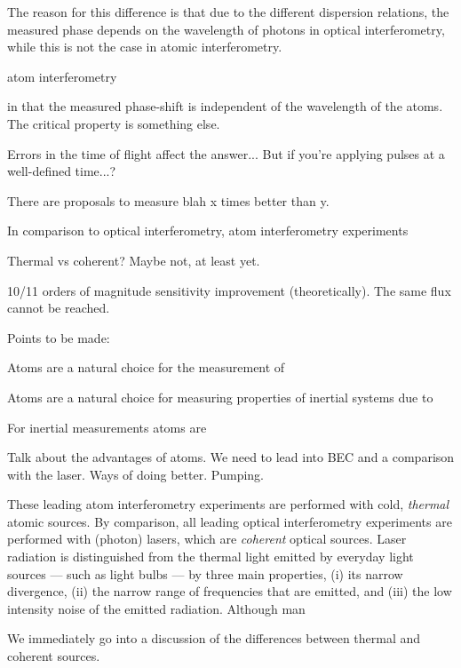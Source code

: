 The reason for this difference is that due to the different dispersion relations, the measured phase depends on the wavelength of photons in optical interferometry, while this is not the case in atomic interferometry.  

atom interferometry 

in that the measured phase-shift is independent of the wavelength of the atoms.  The critical property is something else.  

Errors in the time of flight affect the answer... But if you're applying pulses at a well-defined time...?


There are proposals to measure blah x times better than y.



In comparison to optical interferometry, atom interferometry experiments 

Thermal vs coherent?  Maybe not, at least yet.


10/11 orders of magnitude sensitivity improvement (theoretically).  The same flux cannot be reached.  

Points to be made:



Atoms are a natural choice for the measurement of 

Atoms are a natural choice for measuring properties of inertial systems due to


For inertial measurements atoms are 


Talk about the advantages of atoms.  We need to lead into BEC and a comparison with the laser.  Ways of doing better.  Pumping.




These leading atom interferometry experiments are performed with cold, \emph{thermal} atomic sources.  By comparison, all leading optical interferometry experiments are performed with (photon) lasers, which are \emph{coherent} optical sources.  Laser radiation is distinguished from the thermal light emitted by everyday light sources --- such as light bulbs --- by three main properties, (i) its narrow divergence, (ii) the narrow range of frequencies that are emitted, and (iii) the low intensity noise of the emitted radiation.  Although man

We immediately go into a discussion of the differences between thermal and coherent sources.


